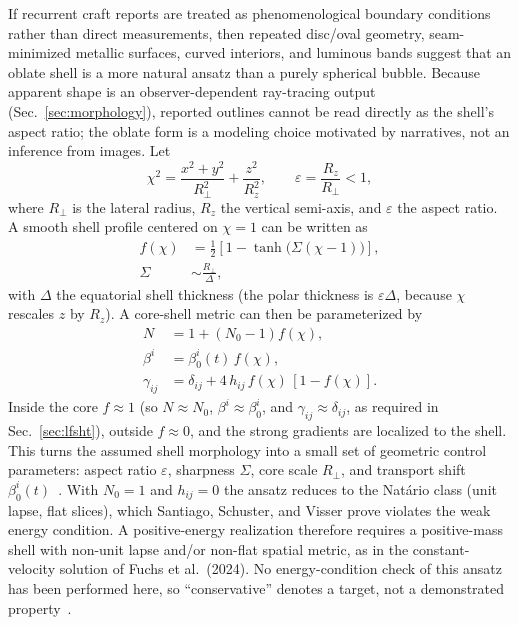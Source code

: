 \documentclass[aps,prd,twocolumn,superscriptaddress,nofootinbib,floatfix]{revtex4-2}
\begin{document}
If recurrent craft reports are treated as phenomenological boundary conditions
rather than direct measurements, then repeated disc/oval geometry,
seam-minimized metallic surfaces, curved interiors, and luminous bands suggest
that an oblate shell is a more natural ansatz than a purely spherical bubble.
Because apparent shape is an observer-dependent ray-tracing output
(Sec.~\ref{sec:morphology}), reported outlines cannot be read directly as the
shell's aspect ratio; the oblate form is a modeling choice motivated by
narratives, not an inference from images. Let
\begin{equation}
\chi^2 = \frac{x^2+y^2}{R_\perp^2} + \frac{z^2}{R_z^2},\qquad
\varepsilon = \frac{R_z}{R_\perp} < 1,
\label{eq:s09-oblate}
\end{equation}
where $R_\perp$ is the lateral radius, $R_z$ the vertical semi-axis, and
$\varepsilon$ the aspect ratio. A smooth shell profile centered on $\chi=1$ can
be written as
\begin{equation}
\begin{aligned}
f(\chi) &= \frac{1}{2}\left[1-\tanh\!\big(\Sigma(\chi-1)\big)\right],\\
\Sigma &\sim \frac{R_\perp}{\Delta},
\end{aligned}
\label{eq:s09-oblate-profile}
\end{equation}
with $\Delta$ the equatorial shell thickness (the polar thickness is
$\varepsilon\Delta$, because $\chi$ rescales $z$ by $R_z$). A core-shell metric can
then be parameterized by
\begin{equation}
\begin{aligned}
N &= 1 + (N_0-1)f(\chi),\\
\beta^i &= \beta_0^i(t)\,f(\chi),\\
\gamma_{ij} &= \delta_{ij} + 4\,h_{ij}\,f(\chi)\,[1-f(\chi)].
\end{aligned}
\label{eq:s09-oblate-ansatz}
\end{equation}
Inside the core $f\approx 1$ (so $N\approx N_0$, $\beta^i\approx\beta_0^i$, and
$\gamma_{ij}\approx\delta_{ij}$, as required in Sec.~\ref{sec:lfsht}), outside
$f\approx 0$, and the strong gradients are localized to the shell. This turns the
assumed shell morphology into a small set of geometric control parameters: aspect
ratio $\varepsilon$, sharpness $\Sigma$, core scale $R_\perp$, and transport shift
$\beta_0^i(t)$~\cite{NASA_UAP2023,BobrickMartire2021,MTW1973,Wald1984}. With
$N_0=1$ and $h_{ij}=0$ the ansatz reduces to the Nat\'ario class (unit lapse, flat
slices), which Santiago, Schuster, and Visser prove violates the weak energy
condition. A positive-energy realization therefore requires a positive-mass shell
with non-unit lapse and/or non-flat spatial metric, as in the constant-velocity
solution of Fuchs et al.~(2024). No energy-condition check of this ansatz has been
performed here, so ``conservative'' denotes a target, not a demonstrated
property~\cite{SantiagoVisser2022,Fuchs2024}.
\end{document}
